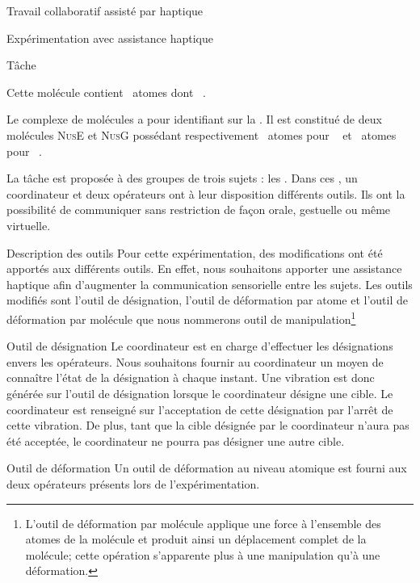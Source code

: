 \documentclass[myfrancais]{mythesis}
\begin{document}
\begin{mychapter}{Travail collaboratif assisté par haptique}
\begin{mysection}{Expérimentation avec assistance haptique}
\begin{mysubsection}{Tâche}
\begin{description}
						Cette molécule contient ~atomes dont ~.
					\item[\myNusENusG]
						Le complexe de molécules \myNusENusG {} a pour identifiant \myPDB {} sur la \myPDBbase\footnotemark[\value{footnote}].
						Il est constitué de deux molécules \textsc{NusE} et \textsc{NusG} possédant respectivement ~atomes pour ~ et ~atomes pour ~.
				\end{description}

				La tâche est proposée à des groupes de trois sujets : les .
				Dans ces , un \og coordinateur \fg et deux \og opérateurs \fg ont à leur disposition différents outils.
				Ils ont la possibilité de communiquer sans restriction de façon orale, gestuelle ou même virtuelle.
				\begin{mysubsubsection}{Description des outils}
					Pour cette expérimentation, des modifications ont été apportés aux différents outils.
					En effet, nous souhaitons apporter une assistance haptique afin d'augmenter la communication sensorielle entre les sujets.
					Les outils modifiés sont l'outil de désignation, l'outil de déformation par atome et l'outil de déformation par molécule que nous nommerons outil de manipulation\footnote{L'outil de déformation par molécule applique une force à l'ensemble des atomes de la molécule et produit ainsi un déplacement complet de la molécule; cette opération s'apparente plus à une manipulation qu'à une déformation.}
					\begin{myparagraph}{Outil de désignation}
						Le coordinateur est en charge d'effectuer les désignations envers les opérateurs.
						Nous souhaitons fournir au coordinateur un moyen de connaître l'état de la désignation à chaque instant.
						Une vibration est donc générée sur l'outil de désignation lorsque le coordinateur désigne une cible.
						Le coordinateur est renseigné sur l'acceptation de cette désignation par l'arrêt de cette vibration.
						De plus, tant que la cible désignée par le coordinateur n'aura pas été acceptée, le coordinateur ne pourra pas désigner une autre cible.
					\end{myparagraph}
					\begin{myparagraph}{Outil de déformation}
						Un outil de déformation au niveau atomique est fourni aux deux opérateurs présents lors de l'expérimentation.

\end{myparagraph}
\end{mysubsubsection}
\end{mysubsection}
\end{mysection}
\end{mychapter}
\end{document}
